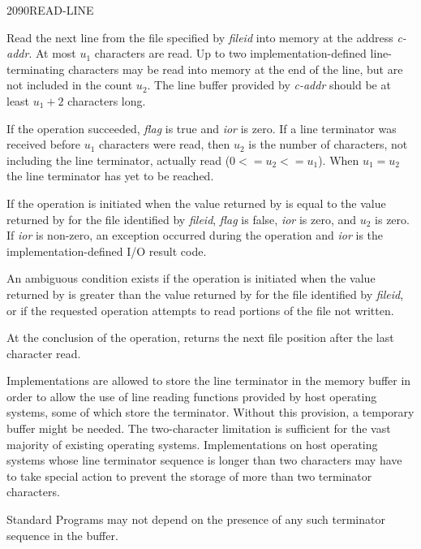 \begin{newword}{2090}{READ-LINE}

	Read the next line from the file specified by \emph{fileid} into
	memory at the address \emph{c-addr}. At most $u_1$ characters
	are read. Up to two implementation-defined line-terminating
	characters may be read into memory at the end of the line, but
	are not included in the count $u_2$. The line buffer provided by
	\emph{c-addr} should be at least $u_1+2$ characters long.

	If the operation succeeded, \emph{flag} is true and \emph{ior} is
	zero. If a line terminator was received before $u_1$ characters
	were read, then $u_2$ is the number of characters, not including
	the line terminator, actually read ($0 <= u_2 <= u_1$). When
	$u_1 = u_2$ the line terminator has yet to be reached.

	If the operation is initiated when the value returned by
	 is equal to the value returned by
	 for the file identified by \emph{fileid},
	\emph{flag} is false, \emph{ior} is zero, and $u_2$ is zero.
	If \emph{ior} is non-zero, an exception occurred during the
	operation and \emph{ior} is the implementation-defined I/O
	result code.

	An ambiguous condition exists if the operation is initiated when
	the value returned by  is greater than the
	value returned by  for the file identified by
	\emph{fileid}, or if the requested operation attempts to read
	portions of the file not written.

	At the conclusion of the operation,  returns
	the next file position after the last character read.

	\begin{rationale} %
		Implementations are allowed to store the line terminator in
		the memory buffer in order to allow the use of line reading
		functions provided by host operating systems, some of which
		store the terminator. Without this provision, a temporary
		buffer might be needed. The two-character limitation is
		sufficient for the vast majority of existing operating
		systems. Implementations on host operating systems whose line
		terminator sequence is longer than two characters may have to
		take special action to prevent the storage of more than two
		terminator characters.

		Standard Programs may not depend on the presence of any such
		terminator sequence in the buffer.


\end{rationale}
\end{newword}
